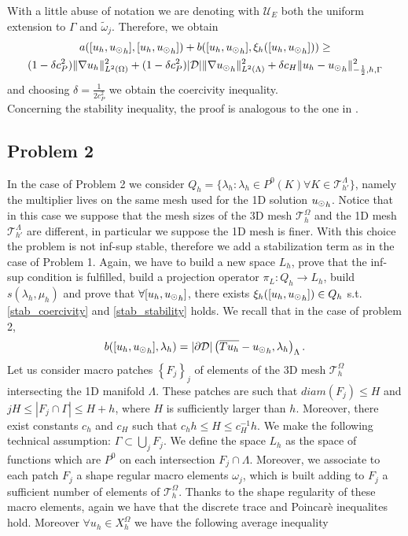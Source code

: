 With a little abuse of notation we are denoting with $\mathcal{U}_E$ both the uniform extension to $\Gamma$ and $\tilde{\omega}_j$. Therefore, we obtain
\begin{multline*}
a([u_h, {u_{\odot}}_h],[u_h, {u_{\odot}}_h] ) + b([u_h, {u_{\odot}}_h], \xi_h([u_h, {u_{\odot}}_h]))
\geq \\
(1-\delta c_P^2) \|\nabla u_h\|^2_{L^2(\Omega)} + (1- \delta c_P^2) |\mathcal{D}|\|\nabla {u_{\odot}}_h\|^2_{L^2(\Lambda)}
+\delta c_H \|u_h-{u_{\odot}}_h\|^2_{-\frac 12,h,\Gamma}
\end{multline*}
and choosing $\delta=\frac{1}{2c_P^2}$ we obtain the coercivity inequality.\\
Concerning the stability inequality, the proof is analogous to the one in \cite{burman2014}.

\subsection{Problem 2} In the case of Problem 2 we consider $Q_h=\{\lambda_{h} : \lambda_h \in P^0(K) \forall K \in \mathcal{T}^{\Lambda}_{h'}\}$, namely the multiplier lives on the same mesh used for the 1D solution ${u_{\odot}}_h$. Notice that in this case we suppose that the mesh sizes of the 3D mesh $	\mathcal{T}^{\Omega}_h$ and the 1D mesh $\mathcal{T}^{\Lambda}_{h'}$ are different, in particular we suppose the 1D mesh is finer. With this choice the problem is not inf-sup stable, therefore we add a stabilization term as in the case of Problem 1. Again, we have to build a new space $L_h$, prove that the inf-sup condition is fulfilled, build a projection operator $\pi_L: Q_h \rightarrow L_h$, build $s(\lambda_h, \mu_h)$ and prove that $\forall [u_h, {u_{\odot}}_h]$, there exists $\xi_h([u_h, {u_{\odot}}_h]) \in Q_h$ s.t. \eqref{stab_coercivity} and \eqref{stab_stability} holds. We recall that in the case of problem 2, 
\begin{equation*}
b([u_h, {u_{\odot}}_h], \lambda _h) = |\partial\mathcal{D}|\left(\overline{T u_h} - {u_{\odot}}_h, \lambda _h\right)_{\Lambda}.
\end{equation*}
Let us consider macro patches $\left\{ F_j \right\}_j$ of elements of the 3D mesh $\mathcal{T}_h^{\Omega}$ intersecting the 1D manifold $\Lambda$. These patches are such that $diam(F_j)\leq H$ and  $jH\leq |F_j\cap \Gamma|\leq H+h$, where $H$ is sufficiently larger than $h$. Moreover, there exist constants $c_h$ and $c_H$ such that $c_hh\leq H \leq c_H^{-1}h$. We make the following technical assumption: $\Gamma \subset \bigcup _{j} F_j$. We define the space $L_h$ as the space of functions which are $P^0$ on each intersection $F_j\cap \Lambda$. Moreover, we associate to each patch $F_j$ a shape regular macro elements $\omega_j$, which is built adding to $F_j$ a sufficient number of elements of $\mathcal{T}_h^{\Omega}$. Thanks to the shape regularity of these macro elements, again we have that the discrete trace and Poincarè inequalites hold. Moreover $\forall u_h \in X_h^\Omega$ we have the following average inequality 
